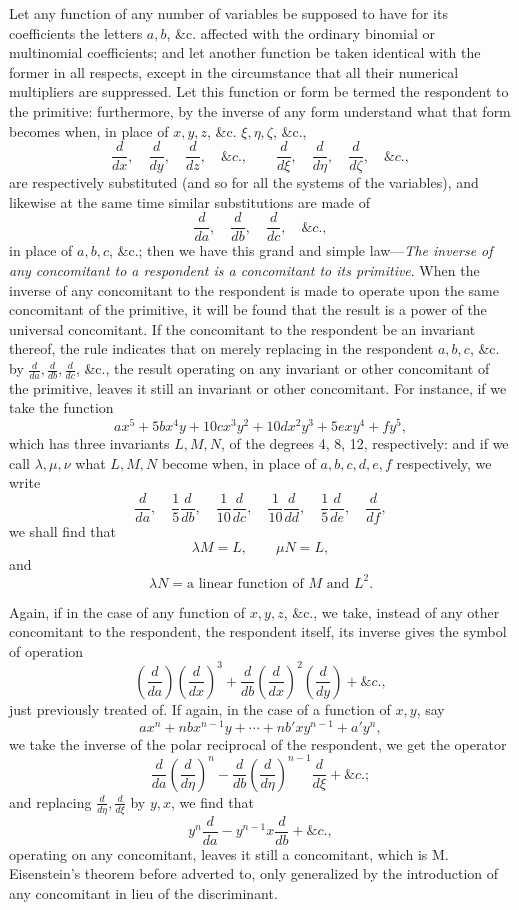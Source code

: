 \documentclass[11pt]{article}
\newcommand{\sourcepage}[1]{\marginpar{\scriptsize p.~#1}}
\begin{document}
Let any function of any number of variables be supposed to have for its coefficients the letters $a,b$, \&c. affected with the ordinary binomial or multinomial coefficients; and let another function be taken identical with the former in all respects, except in the circumstance that all their numerical multipliers are suppressed. Let this function or form be termed the respondent to the primitive: furthermore, by the inverse of any form understand what that form becomes when, in place of $x,y,z$, \&c. $\xi,\eta,\zeta$, \&c.,
\[
\frac{d}{dx},\quad \frac{d}{dy},\quad \frac{d}{dz},\quad \&c.,
\qquad
\frac{d}{d\xi},\quad \frac{d}{d\eta},\quad \frac{d}{d\zeta},\quad \&c.,
\]
are respectively substituted (and so for all the systems of the variables), and likewise at the same time similar substitutions are made of
\[
\frac{d}{da},\quad \frac{d}{db},\quad \frac{d}{dc},\quad \&c.,
\]
in place of $a,b,c$, \&c.; then we have this grand and simple law---\emph{The inverse of any concomitant to a respondent is a concomitant to its primitive}. When the inverse of any concomitant to the respondent is made to operate upon the same concomitant of the primitive, it will be found that the result is a power of the universal concomitant. If the concomitant to the respondent be an invariant thereof, the rule indicates that on merely replacing in the respondent $a,b,c$, \&c. by $\frac{d}{da},\frac{d}{db},\frac{d}{dc}$, \&c., the result operating on any invariant or other concomitant of the primitive, leaves it still an invariant or other concomitant. For instance, if we take the function
\[
ax^5+5bx^4y+10cx^3y^2+10dx^2y^3+5exy^4+fy^5,
\]
which has three invariants $L,M,N$, of the degrees 4, 8, 12, respectively: and if we call $\lambda,\mu,\nu$ what $L,M,N$ become when, in place of $a,b,c,d,e,f$ respectively, we write
\[
\frac{d}{da},\quad \frac15\frac{d}{db},\quad
\frac1{10}\frac{d}{dc},\quad \frac1{10}\frac{d}{dd},\quad
\frac15\frac{d}{de},\quad \frac{d}{df},
\]
we shall find that
\[
\lambda M=L,\qquad \mu N=L,
\]
and
\[
\lambda N=\text{a linear function of }M\text{ and }L^2.
\]

\sourcepage{341}
Again, if in the case of any function of $x,y,z$, \&c., we take, instead of any other concomitant to the respondent, the respondent itself, its inverse gives the symbol of operation
\[
\left(\frac{d}{da}\right)\left(\frac{d}{dx}\right)^3
+\frac{d}{db}\left(\frac{d}{dx}\right)^2\left(\frac{d}{dy}\right)+\&c.,
\]
just previously treated of. If again, in the case of a function of $x,y$, say
\[
ax^n+nbx^{n-1}y+\cdots+nb'xy^{n-1}+a'y^n,
\]
we take the inverse of the polar reciprocal of the respondent, we get the operator
\[
\frac{d}{da}\left(\frac{d}{d\eta}\right)^n
-\frac{d}{db}\left(\frac{d}{d\eta}\right)^{n-1}\frac{d}{d\xi}
+\&c.;
\]
and replacing $\frac{d}{d\eta},\frac{d}{d\xi}$ by $y,x$, we find that
\[
y^n\frac{d}{da}-y^{n-1}x\frac{d}{db}+\&c.,
\]
operating on any concomitant, leaves it still a concomitant, which is M. Eisenstein's theorem before adverted to, only generalized by the introduction of any concomitant in lieu of the discriminant.
\end{document}
